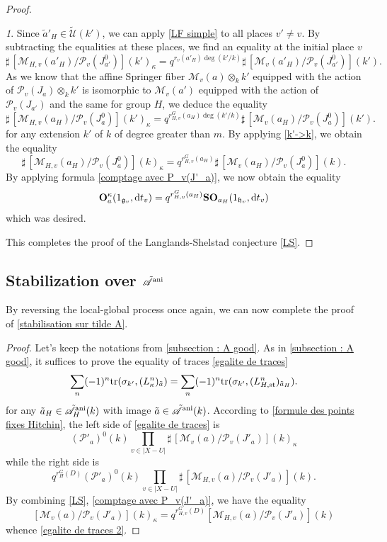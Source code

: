 \documentclass[12pt,english]{smfart}
\numberwithin{equation}{subsection}
\theoremstyle{remark}
\newtheorem{numero}[equation]{}
\newcommand\calA{{\mathscr A}}
\newcommand\calP{{\mathscr P}}
\newcommand\calM{{\mathscr M}}
\newcommand\calU{{\mathscr U}}
\newcommand\frakg{{\mathfrak g}}
\newcommand\frakh{\mathfrak h}
\newcommand\tr{{\rm tr}}
\newcommand\ani{{\rm ani}}
\begin{document}
\begin{proof}
\begin{numero}
Since $\tilde a'_H\in \tilde\calU(k')$, we can apply \ref{LF simple}
to all places $v'\not=v$. By subtracting the equalities at these
places, we find an equality at the initial place $v$
$${\sharp\,}[\calM_{H,v}(a'_H)/\calP_{v}(J^0_{a'})](k')_\kappa
=q^{r_v(a'_H)\deg(k'/ k)} {\sharp\,} [\calM_{v}(a'_H)/\calP_{v}(J^0_{a'})](k').
$$
As we know that the affine Springer fiber $\calM_v(a)\otimes_k k'$ equipped
with the action of $\calP_v(J_a)\otimes_k k'$ is isomorphic to $\calM_v(a')$
equipped with the action of $\calP_v(J_{a'})$ and the same for group
$H$, we deduce the equality
$${\sharp\,}[\calM_{H,v}(a_H)/\calP_{v}(J^0_a)](k')_\kappa
=q^{r_{H,v}^G(a_H)\deg(k'/ k)} {\sharp\,} [\calM_{v}(a_H)/\calP_{v}(J^0_a)](k').
$$
for any extension $k'$ of $k$ of degree greater than $m$. By
applying \ref{k'->k}, we obtain the equality
$${\sharp\,}[\calM_{H,v}(a_H)/\calP_{v}(J^0_a)](k)_\kappa
=q^{r_{H,v}^G(a_H)} {\sharp\,} [\calM_{v}(a_H)/\calP_{v}(J^0_a)](k).
$$
By applying formula \ref{comptage avec P_v(J'_a)}, we now obtain
the equality
$${\bf O}_{a}^\kappa(1_{\frakg_v},{\rm d}t_v)=q^{r_{H,v}^G(a_H)}
{\bf SO}_{a_H}(1_{\frakh_v},{\rm d}t_v)
$$
which was desired.
\end{numero}

This completes the proof of the Langlands-Shelstad conjecture
\ref{LS}.
\end{proof}

\subsection{Stabilization over $\tilde\calA^\ani$}
\label{subsection : renversement}\label{subsection : stabilisation geometrique}

By reversing the local-global process once again, we can
now complete the proof of \ref{stabilisation sur tilde A}.

\begin{proof}
Let's keep the notations from \ref{subsection : A good}. As in
\ref{subsection : A good}, it suffices to prove the equality of traces
\ref{egalite de traces}
\begin{equation}\label{egalite de traces 2}
\sum_{n} (-1)^{n}\tr(\sigma_{k'},(L^n_\kappa)_{\tilde a}) \\
=\sum_{n} (-1)^{n} \tr(\sigma_{k'},(L^n_{H,{\rm st}})_{\tilde a_H}).
\end{equation}
for any $\tilde a_H\in\tilde\calA_H^\ani(k)$ with image $\tilde a\in
\tilde\calA^\ani(k)$. According to \ref{formule des points fixes Hitchin}, the
left side of \ref{egalite de traces} is
$$(\calP'_a)^0(k) \prod_{v\in |X-U|} \sharp\,
[\calM_v(a)/\calP_v(J'_a)](k)_\kappa
$$
while the right side is
$$q^{r_H^G(D)}(\calP'_a)^0(k) \prod_{v\in |X-U|} \sharp\,
[\calM_{H,v}(a)/\calP_v(J'_a)](k).
$$
By combining \ref{LS}, \ref{comptage avec P_v(J'_a)}, we have the equality
$$[\calM_v(a)/\calP_v(J'_a)](k)_\kappa=q^{r_{H,v}^G(D)}[\calM_{H,v}(a)/\calP_v(J'_a)](k)$$
whence \ref{egalite de traces 2}.
\end{proof}
\end{document}
